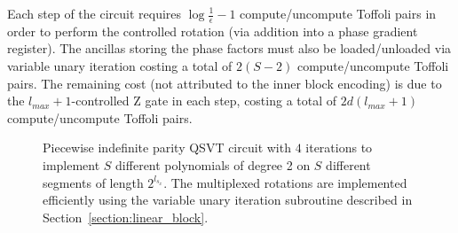 \documentclass[aps,prx,twocolumn,floatfix,10pt,amssymb,amsfont,amsmath,superscriptaddress,float,nofootinbib,longbibliography,nobalancelastpage]{revtex4-2}
\theoremstyle{empty}
\begin{document}
Each step of the circuit requires $\log\frac{1}{\epsilon} -1$ compute/uncompute Toffoli pairs in order to perform the controlled rotation (via addition into a phase gradient register). The ancillas storing the phase factors must also be loaded/unloaded via variable unary iteration costing a total of $2(S-2)$ compute/uncompute Toffoli pairs. The remaining cost (not attributed to the inner block encoding) is due to the $l_{max}+1$-controlled Z gate in each step, costing a total of $2d(l_{max}+1)$ compute/uncompute Toffoli pairs.
\begin{figure}[htbp]
\caption{Piecewise indefinite parity QSVT circuit with $4$ iterations to implement $S$ different polynomials of degree 2 on $S$ different segments of length $2^{l_{s_x}}$. The multiplexed rotations are implemented efficiently using the variable unary iteration subroutine described in Section~\ref{section:linear_block}.}
\label{fig:circuit}
\end{figure}
\end{document}
